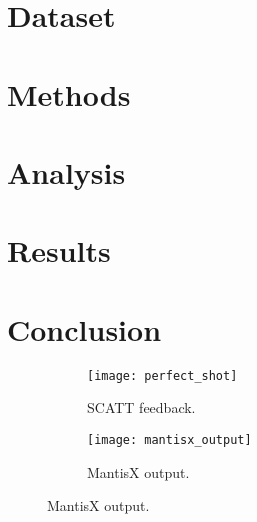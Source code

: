 \documentclass[conference]{IEEEtran}
\begin{document}
\section{Dataset}


\section{Methods}
\section{Analysis}
\section{Results}
\section{Conclusion}




%
%





\begin{figure}[h]
	\begin{subfigure}{.5\textwidth}
		\centering
		\texttt{[image: perfect\_shot]}
		\caption{SCATT \cite{scatt} feedback.}
	\end{subfigure}
	\begin{subfigure}{.5\textwidth}
		\centering
		\texttt{[image: mantisx\_output]}
		\caption{MantisX output.}
	\end{subfigure}
\end{figure}




\clearpage


\end{document}
